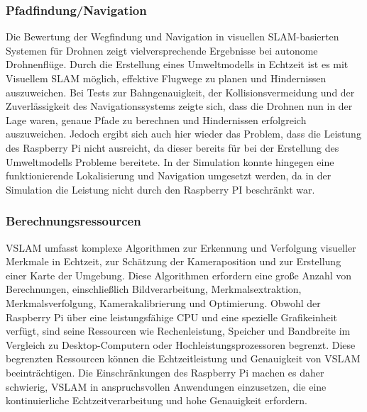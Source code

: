 \subsubsection{Pfadfindung/Navigation}

Die Bewertung der Wegfindung und Navigation in visuellen SLAM-basierten Systemen für Drohnen zeigt vielversprechende Ergebnisse bei autonome Drohnenflüge. Durch die Erstellung eines Umweltmodells in Echtzeit ist es mit Visuellem SLAM möglich, effektive Flugwege zu planen und Hindernissen auszuweichen. Bei Tests zur Bahngenauigkeit, der Kollisionsvermeidung und der Zuverlässigkeit des Navigationssystems zeigte sich, dass die Drohnen nun in der Lage waren, genaue Pfade zu berechnen und Hindernissen erfolgreich auszuweichen. Jedoch ergibt sich auch hier wieder das Problem, dass die Leistung des Raspberry Pi nicht ausreicht, da dieser bereits für bei der Erstellung des Umweltmodells Probleme bereitete. In der Simulation konnte hingegen eine funktionierende Lokalisierung und Navigation umgesetzt werden, da in der Simulation die Leistung nicht durch den Raspberry PI beschränkt war.

\subsubsection{Berechnungsressourcen}

\ac{VSLAM} umfasst komplexe Algorithmen zur Erkennung und Verfolgung visueller Merkmale in Echtzeit, zur Schätzung der Kameraposition und zur Erstellung einer Karte der Umgebung. Diese Algorithmen erfordern eine große Anzahl von Berechnungen, einschließlich Bildverarbeitung, Merkmalsextraktion, Merkmalsverfolgung, Kamerakalibrierung und Optimierung. Obwohl der Raspberry Pi über eine leistungsfähige CPU und eine spezielle Grafikeinheit verfügt, sind seine Ressourcen wie Rechenleistung, Speicher und Bandbreite im Vergleich zu Desktop-Computern oder Hochleistungsprozessoren begrenzt. Diese begrenzten Ressourcen können die Echtzeitleistung und Genauigkeit von \ac{VSLAM} beeinträchtigen. Die Einschränkungen des Raspberry Pi machen es daher schwierig, \ac{VSLAM} in anspruchsvollen Anwendungen einzusetzen, die eine kontinuierliche Echtzeitverarbeitung und hohe Genauigkeit erfordern.

